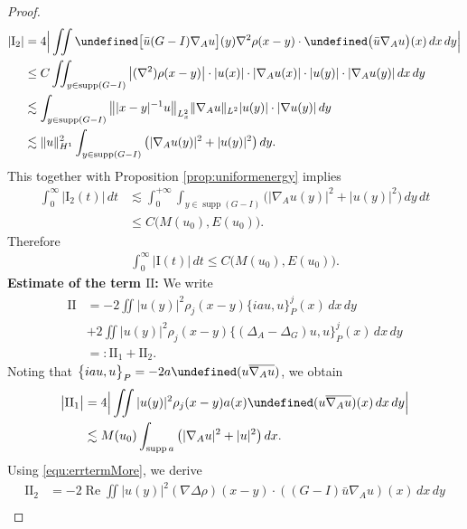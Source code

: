 \documentclass[10pt%
]{amsart}
\numberwithin{equation}{section}
\let\Im=\undefined\DeclareMathOperator*{\Im}{Im}
\theoremstyle{definition}
\begin{document}
\begin{proof}
	\begin{align*}
		|\textrm{I}_2|&=4\Big| \iint \Im \big[\bar{u}(G-I)\nabla_A u\big](y)\nabla^2\rho(x-y)\cdot \Im \big(\bar{u}\nabla_Au\big)(x)\,dx\,dy\Big|\\
		&\le C\iint_{y\in\mathop{\mathrm{supp}} (G-I)}\big|(\nabla^2)\rho(x-y)\big|\cdot|u(x)|\cdot|\nabla_A u(x)|\cdot|u(y)|\cdot|\nabla_A u(y)|\,dx\,dy\\
		&\lesssim \int_{y\in\mathop{\mathrm{supp}} (G-I)}\big\||x-y|^{-1}u\big\|_{L^2_x}
		\|\nabla_A u\|_{L^2}|u(y)|\cdot|\nabla u(y)|\,dy\\
		&\lesssim \|u\|_{H^1}^2\int_{y\in\mathop{\mathrm{supp}} (G-I)}\big(|\nabla_A u(y)|^2+|u(y)|^2\big)\,dy.
	\end{align*}
	This together with Proposition \ref{prop:uniformenergy} implies
	\begin{align*}
		\int_0^{\infty} |\textrm{I}_2(t)|\,dt&\lesssim  \int_0^{+\infty} \int_{y\in\mathop{\mathrm{supp}} (G-I)}\big(|\nabla_A u(y)|^2+|u(y)|^2\big)\,dy\,dt\\
		&\le C\big(M(u_0),E(u_0)\big).
	\end{align*}
	Therefore
	\begin{align*}%
		\int_0^{\infty} |\textrm{I}(t)|\,dt \le C\big(M(u_0),E(u_0)\big).
	\end{align*}
	{\bf Estimate of the term $\textrm{II}$:}
	We write
	\begin{align*}
		\textrm{II}&=-2\iint |u(y)|^2\rho_j(x-y)\big\{iau,u\big\}_P^j(x)\,dx\,dy\\
		&+2\iint  |u(y)|^2\rho_j(x-y)\big\{(\Delta_A-\Delta_G)u,u\big\}_P^j(x)\,dx\,dy\\
		&=: \textrm{II}_1+\textrm{II}_2.
	\end{align*}
	Noting that $\big\{iau,u\big\}_P=-2a\Im (u\overline{\nabla_Au})$, we obtain
	\begin{align*}
		\big|\textrm{II}_1\big|
		&=4\Big|\iint |u(y)|^2\rho_j(x-y)a(x)\Im (u\overline{\nabla_Au})(x)\,dx\,dy\Big|\\
		&\lesssim M(u_0)\int_{\mathop{\mathrm{supp}}  a}\big(|\nabla_A u|^2+|u|^2\big)\,dx.
	\end{align*}
	Using \eqref{equ:errtermMore}, we derive
	\begin{align*}
		\textrm{II}_2
		&=-2\mathop{\mathrm{Re}} \iint |u(y)|^2(\nabla\Delta \rho)(x-y)\cdot \left((G-I)\bar{u}\nabla_A u\right)(x)\,dx\,dy\\

\end{align*}
\end{proof}
\end{document}
